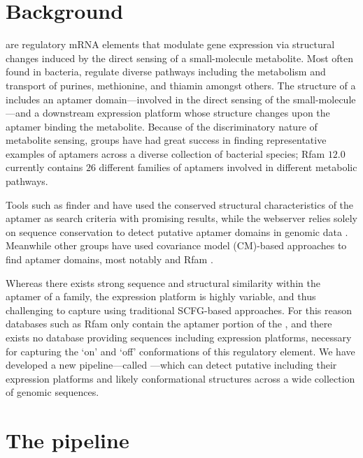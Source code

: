 \section{Background}
\label{sec:rfinder:bkgrnd}

\Rbs are regulatory mRNA elements that modulate gene expression via
structural changes induced by the direct sensing of a small-molecule metabolite.
Most often found in bacteria, \rbs regulate diverse pathways including the
metabolism and transport of purines, methionine, and thiamin amongst others. The
structure of a \rb includes an aptamer domain---involved in the direct
sensing of the small-molecule---and a downstream expression platform whose
structure changes upon the aptamer binding the metabolite. Because of the
discriminatory nature of metabolite sensing, groups have had great success in
finding representative examples of aptamers across a diverse collection of
bacterial species; Rfam $12.0$ currently contains $26$ different families of aptamers
involved in different metabolic pathways.

Tools such as \Rb finder \citep{bengert2004} and 
\citep{chang:2009de} have used the conserved
structural characteristics of the aptamer as search criteria with promising
results, while the webserver  relies solely on sequence conservation
to detect putative aptamer domains in genomic data \citep{abreugoodger:2005hb}.
Meanwhile other groups have used covariance model (CM)-based approaches to find
aptamer domains, most notably  \citep{yao2006} and Rfam
\citep{nawrocki:2014uy}.

Whereas there exists strong sequence and
structural similarity within the aptamer of a \rb family, the expression
platform is highly variable, and thus challenging to capture using traditional
SCFG-based approaches. For this reason databases such as Rfam only contain the aptamer
portion of the \rb, and there exists no database providing sequences
including expression platforms, necessary for capturing the `on' and `off'
conformations of this regulatory element. We have developed a new
pipeline---called \rfinder---which can detect putative \rbs including their
expression platforms and likely conformational structures across a wide collection
of genomic sequences.

\section{The \rfinder pipeline}
\label{sec:rfinder:pipeline}

